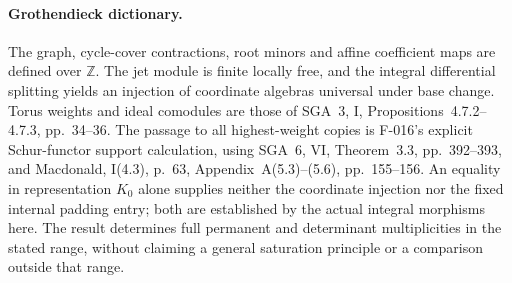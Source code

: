 \paragraph{Grothendieck dictionary.}
The graph, cycle-cover contractions, root minors and affine
coefficient maps are defined over \(\mathbb Z\). The jet
module is finite locally free, and the integral differential
splitting yields an injection of coordinate algebras universal
under base change. Torus weights and ideal comodules are
those of SGA~3, I, Propositions~4.7.2--4.7.3, pp.~34--36.
The passage to all highest-weight copies is F-016's explicit
Schur-functor support calculation, using SGA~6, VI,
Theorem~3.3, pp.~392--393, and Macdonald, I(4.3), p.~63,
Appendix~A(5.3)--(5.6), pp.~155--156.
An equality in representation \(K_0\) alone supplies
neither the coordinate injection nor the fixed internal
padding entry; both are established by the actual integral
morphisms here. The result determines full permanent and
determinant multiplicities in the stated range, without
claiming a general saturation principle or a comparison
outside that range.
